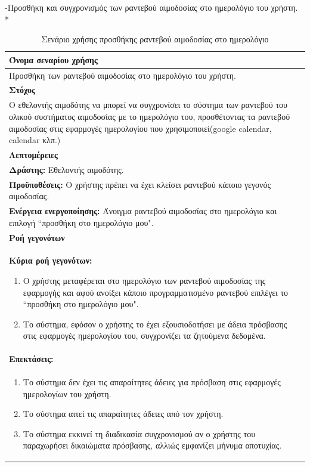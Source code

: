 \newpage			
-Προσθήκη και συγχρονισμός των ραντεβού αιμοδοσίας στο ημερολόγιο του χρήστη.
\\*
\begin{table}[H]
	\begin{center}
	    \begin{tabular}{|p{\dimexpr \linewidth-2\tabcolsep}|}
	    \hline
	    \rowcolor{grayy}
	    \textbf{Όνομα σεναρίου χρήσης}
	    \\ \hline    
	    Προσθήκη των ραντεβού αιμοδοσίας στο ημερολόγιο του χρήστη.
	     \\ \hline
	    \rowcolor{grayy}
	    \textbf{\textbf{Στόχος}}
	    \\ \hline
	 	 Ο εθελοντής αιμοδότης να μπορεί να συγχρονίσει το σύστημα των ραντεβού του ολικού συστήματος αιμοδοσίας με το ημερολόγιο του, προσθέτοντας τα  ραντεβού αιμοδοσίας στις εφαρμογές ημερολογίου που χρησιμοποιεί(google calendar, calendar κλπ.)
	    \\ \hline
	    \rowcolor{grayy}
	    \textbf{Λεπτομέρειες}
	    \\ \hline
		\textbf{Δράστης:} Εθελοντής αιμοδότης.
		\\*
		\textbf{Προϋποθέσεις:} Ο χρήστης πρέπει να έχει κλείσει ραντεβού κάποιο γεγονός αιμοδοσίας.
		\\*
		\textbf{Ενέργεια ενεργοποίησης:} Άνοιγμα ραντεβού αιμοδοσίας  στο ημερολόγιο και επιλογή ``προσθήκη στο ημερολόγιο μου".
	    \\ \hline
		\rowcolor{grayy}    
	    \textbf{Ροή γεγονότων}
	    \\ \hline
		\textbf{Κύρια ροή γεγονότων:}
		\begin{enumerate}
		\item	 Ο χρήστης μεταφέρεται στο ημερολόγιο των ραντεβού αιμοδοσίας της εφαρμογής και αφού ανοίξει κάποιο προγραμματισμένο ραντεβού επιλέγει το ``προσθήκη στο ημερολόγιο μου".
		\item  Το σύστημα, εφόσον ο χρήστης το έχει εξουσιοδοτήσει με άδεια πρόσβασης στις εφαρμογές ημερολογίου του, συγχρονίζει τα ζητούμενα δεδομένα.
		\end{enumerate}
		\\ \hline
		\rowcolor{grayy}
		\textbf{Επεκτάσεις:}
		   \\ \hline
		\begin{enumerate}
			\item Το σύστημα δεν έχει τις απαραίτητες άδειες για πρόσβαση στις εφαρμογές ημερολογίων του χρήστη.
			\item Το σύστημα αιτεί τις απαραίτητες άδειες από τον χρήστη.
			\item Το σύστημα εκκινεί τη διαδικασία συγχρονισμού αν ο χρήστης του παραχωρήσει δικαιώματα πρόσβασης, αλλιώς εμφανίζει μήνυμα αποτυχίας.
		\end{enumerate}
		\\ \hline
	    \end{tabular}
	    \caption{Σενάριο χρήσης προσθήκης ραντεβού αιμοδοσίας στο ημερολόγιο}
	    \label{tab:add_blood_donation_to_calendar}
	\end{center}
\end{table}	

